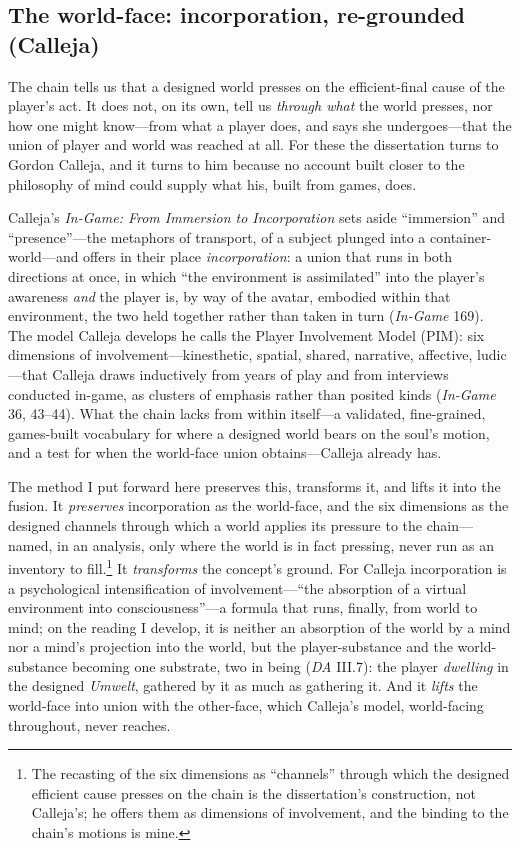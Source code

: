 \documentclass{article}
\begin{document}
\subsection{The world-face: incorporation, re-grounded (Calleja)}

The chain tells us that a designed world presses on the efficient-final cause of the player's act. It does not, on its own, tell us \textit{through what} the world presses, nor how one might know---from what a player does, and says she undergoes---that the union of player and world was reached at all. For these the dissertation turns to Gordon Calleja, and it turns to him because no account built closer to the philosophy of mind could supply what his, built from games, does.

Calleja's \textit{In-Game: From Immersion to Incorporation} sets aside ``immersion'' and ``presence''---the metaphors of transport, of a subject plunged into a container-world---and offers in their place \textit{incorporation}: a union that runs in both directions at once, in which ``the environment is assimilated'' into the player's awareness \textit{and} the player is, by way of the avatar, embodied within that environment, the two held together rather than taken in turn (\textit{In-Game} 169). The model Calleja develops he calls the Player Involvement Model (PIM): six dimensions of involvement---kinesthetic, spatial, shared, narrative, affective, ludic---that Calleja draws inductively from years of play and from interviews conducted in-game, as clusters of emphasis rather than posited kinds (\textit{In-Game} 36, 43--44). What the chain lacks from within itself---a validated, fine-grained, games-built vocabulary for where a designed world bears on the soul's motion, and a test for when the world-face union obtains---Calleja already has.

The method I put forward here preserves this, transforms it, and lifts it into the fusion. It \textit{preserves} incorporation as the world-face, and the six dimensions as the designed channels through which a world applies its pressure to the chain---named, in an analysis, only where the world is in fact pressing, never run as an inventory to fill.\footnote{The recasting of the six dimensions as ``channels'' through which the designed efficient cause presses on the chain is the dissertation's construction, not Calleja's; he offers them as dimensions of involvement, and the binding to the chain's motions is mine.} It \textit{transforms} the concept's ground. For Calleja incorporation is a psychological intensification of involvement---``the absorption of a virtual environment into consciousness''---a formula that runs, finally, from world to mind; on the reading I develop, it is neither an absorption of the world by a mind nor a mind's projection into the world, but the player-substance and the world-substance becoming one substrate, two in being (\textit{DA} III.7): the player \textit{dwelling} in the designed \textit{Umwelt}, gathered by it as much as gathering it. And it \textit{lifts} the world-face into union with the other-face, which Calleja's model, world-facing throughout, never reaches.
\end{document}
